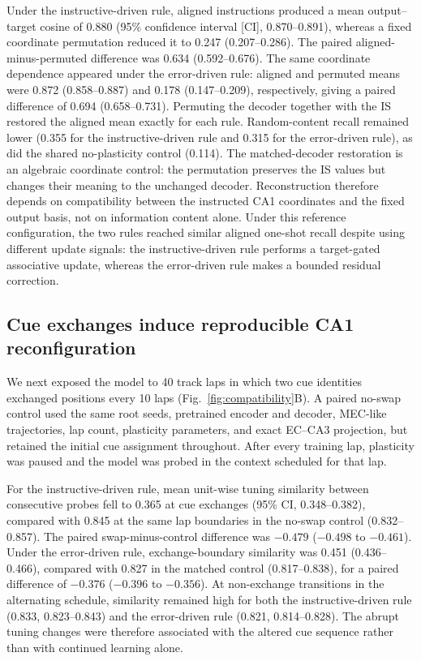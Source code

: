 Under the instructive-driven rule, aligned instructions produced a mean output--target
cosine of 0.880 (95\% confidence interval [CI], 0.870--0.891), whereas a fixed
coordinate permutation reduced it to 0.247 (0.207--0.286). The paired
aligned-minus-permuted difference was 0.634 (0.592--0.676). The same coordinate
dependence appeared under the error-driven rule: aligned and permuted means
were 0.872 (0.858--0.887) and 0.178 (0.147--0.209), respectively, giving a
paired difference of 0.694 (0.658--0.731). Permuting the decoder together with
the IS restored the aligned mean exactly for each rule. Random-content recall
remained lower (0.355 for the instructive-driven rule and 0.315 for the
error-driven rule), as did the shared
no-plasticity control (0.114). The matched-decoder restoration is an algebraic
coordinate control: the permutation preserves the IS values but changes their
meaning to the unchanged decoder. Reconstruction therefore depends on
compatibility between the instructed CA1 coordinates and the fixed output
basis, not on information content alone. Under this reference configuration,
the two rules reached similar aligned one-shot recall despite using different
update signals: the instructive-driven rule performs a target-gated associative update,
whereas the error-driven rule makes a bounded residual correction.

\subsection{Cue exchanges induce reproducible CA1 reconfiguration}

We next exposed the model to 40 track laps in which two cue identities exchanged
positions every 10 laps (Fig.~\ref{fig:compatibility}B). A paired no-swap
control used the same root seeds, pretrained encoder and decoder, MEC-like
trajectories, lap count, plasticity parameters, and exact EC--CA3 projection,
but retained the initial cue assignment throughout.
After every training lap, plasticity was paused and the model was probed in the
context scheduled for that lap.

For the instructive-driven rule, mean unit-wise tuning similarity between consecutive probes
fell to 0.365 at cue exchanges (95\% CI, 0.348--0.382), compared with 0.845 at
the same lap boundaries in the no-swap control (0.832--0.857). The paired
swap-minus-control difference was $-0.479$ ($-0.498$ to $-0.461$). Under the
error-driven rule, exchange-boundary similarity was 0.451 (0.436--0.466),
compared with 0.827 in the matched control (0.817--0.838), for a paired
difference of $-0.376$ ($-0.396$ to $-0.356$). At non-exchange transitions in
the alternating schedule, similarity remained high for both the instructive-driven
rule (0.833, 0.823--0.843) and the error-driven rule (0.821, 0.814--0.828).
The abrupt tuning changes were
therefore associated with the altered cue sequence rather than with continued
learning alone.

